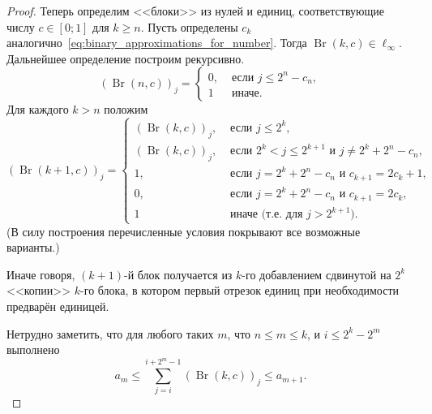 \begin{proof}
	Теперь определим <<блоки>> из нулей и единиц, соответствующие числу $c\in[0;1]$ для $k \geq n$.
	Пусть определены $c_k$ аналогично~\eqref{eq:binary_approximations_for_number}.
	Тогда $\operatorname{Br}(k,c) \in \ell_\infty$.
	Дальнейшее определение построим рекурсивно.
	\begin{equation}
		(\operatorname{Br}(n,c))_j = \begin{cases}
			0, & \mbox{~если~} j \leq 2^n - c_n,
			\\
			1  & \mbox{~иначе}
			.
		\end{cases}
	\end{equation}
	Для каждого $k > n$ положим
	\begin{equation}
		(\operatorname{Br}(k+1,c))_j = \begin{cases}
			(\operatorname{Br}(k,c))_j, &  \mbox{~если~} j \leq 2^k,
			\\
			(\operatorname{Br}(k,c))_j, &  \mbox{~если~} 2^k < j \leq 2^{k+1} \mbox{~и~} j \neq 2^k + 2^n - c_n,
			\\
			1, & \mbox{~если~} j = 2^k + 2^n - c_n \mbox{~и~} c_{k+1} = 2 c_k + 1,
			\\
			0, & \mbox{~если~} j = 2^k + 2^n - c_n \mbox{~и~} c_{k+1} = 2 c_k,
			\\
			1  & \mbox{~иначе (т.е. для $j > 2^{k+1}$)}
			.
		\end{cases}
	\end{equation}
	(В силу построения перечисленные условия покрывают все возможные варианты.)

	Иначе говоря, $(k+1)$-й блок получается из $k$-го добавлением сдвинутой на $2^k$ <<копии>> $k$-го блока,
	в котором первый отрезок единиц при необходимости предварён единицей.

	Нетрудно заметить, что для любого таких $m$, что $n \leq m \leq k$, и $ i \leq 2^k - 2^m$
	выполнено
	\begin{equation}
		a_m \leq \sum_{j=i}^{i+2^m-1} (\operatorname{Br}(k,c))_j \leq a_{m+1}
		.
	\end{equation}



\end{proof}
